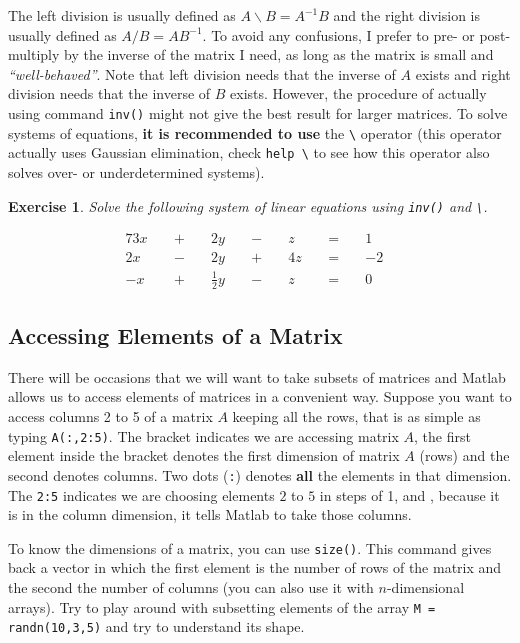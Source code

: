 \documentclass[a4paper,11pt]{article}
\newtheorem{exercise}{Exercise}
\begin{document}
The left division is usually defined as $A \backslash B = A^{-1} B$ and the right division is usually defined as $ A / B = AB^{-1}$. To avoid any confusions, I prefer to pre- or post-multiply by the inverse of the matrix I need, as long as the matrix is small and \textit{``well-behaved''}. Note that left division needs that the inverse of $A$ exists and right division needs that the inverse of $B$ exists. However, the procedure of actually using command \verb;inv(); might not give the best result for larger matrices. To solve systems of equations, \textbf{it is recommended to use} the \verb;\; operator (this operator actually uses Gaussian elimination, check \verb;help \; to see how this operator also solves over- or underdetermined systems). 

\begin{exercise} 
Solve the following system of linear equations using \verb;inv(); and \verb;\;.

\begin{alignat*}{7}
3x&& \; + \; &&2y&& \; - \; &&z&& \; = \; &&1&\\
2x&& \; - \; &&2y&& \; + \; &&4z&& \; = \; &&-2&\\
-x&& \; + \; &&{\tfrac {1}{2}}y&& \; - \; &&z&& \; = \; &&0&
\end{alignat*}
\end{exercise}

\subsection{Accessing Elements of a Matrix}

There will be occasions that we will want to take subsets of matrices and Matlab allows us to access elements of matrices in a convenient way. Suppose you want to access columns 2 to 5 of a matrix $A$ keeping all the rows, that is as simple as typing \verb;A(:,2:5);. The bracket indicates we are accessing matrix $A$, the first element inside the bracket denotes the first dimension of matrix $A$ (rows) and the second denotes columns. Two dots (\verb;:;) denotes \textbf{all} the elements in that dimension. The \verb;2:5; indicates we are choosing elements $2$ to $5$ in steps of 1, and , because it is in the column dimension, it tells Matlab to take those columns.

To know the dimensions of a matrix, you can use \verb;size();. This command gives back a vector in which the first element is the number of rows of the matrix and the second the number of columns (you can also use it with $n$-dimensional arrays). Try to play around with subsetting elements of the array \verb;M = randn(10,3,5); and try to understand its shape.
\end{document}
